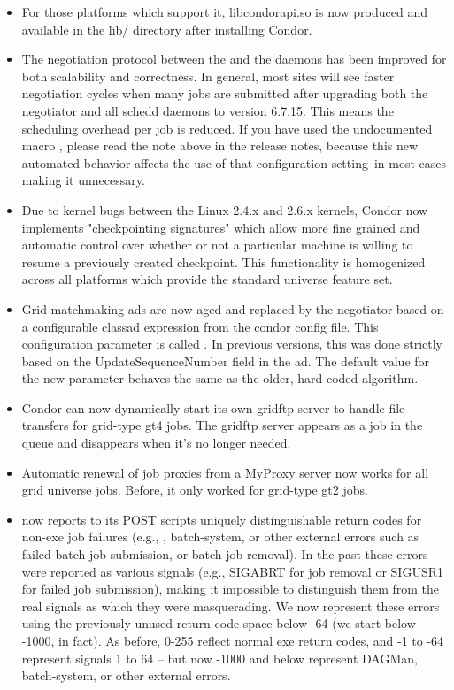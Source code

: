 \begin{itemize}

\item For those platforms which support it, libcondorapi.so is now
produced and available in the lib/ directory after installing Condor.

\item The negotiation protocol between the  and
the  daemons has been improved for both scalability and
correctness.  In general, most sites will see faster negotiation 
cycles when many jobs are submitted after upgrading both the negotiator
and all schedd daemons to version 6.7.15.  This means the scheduling overhead
per job is reduced.  If you have used the undocumented macro
, please read the note above in the release
notes, because this new automated behavior affects the use of that
configuration setting--in most cases making it unnecessary.

\item Due to kernel bugs between the Linux 2.4.x and 2.6.x kernels,
Condor now implements "checkpointing signatures" which allow more fine
grained and automatic control over whether or not a particular machine
is willing to resume a previously created checkpoint. This functionality
is homogenized across all platforms which provide the standard universe
feature set.

\item Grid matchmaking ads are now aged and replaced by the negotiator 
based on a configurable classad expression from the condor config file. This
configuration parameter is called .  
In previous versions, this was done strictly based on the 
UpdateSequenceNumber field in the ad.  The default value for the new 
parameter behaves the same as the older, hard-coded algorithm.

\item Condor can now dynamically start its own gridftp server to handle
file transfers for grid-type gt4 jobs. The gridftp server appears
as a job in the queue and disappears when it's no longer needed.

\item Automatic renewal of job proxies from a MyProxy server now works for
all grid universe jobs. Before, it only worked for grid-type gt2 jobs.

\item {} now reports to its POST scripts uniquely
distinguishable return codes for non-exe job failures (e.g.,
, batch-system, or other external errors such as failed
batch job submission, or batch job removal).  In the past these errors
were reported as various signals (e.g., SIGABRT for job removal or
SIGUSR1 for failed job submission), making it impossible to
distinguish them from the real signals as which they were
masquerading.  We now represent these errors using the
previously-unused return-code space below -64 (we start below -1000,
in fact).  As before, 0-255 reflect normal exe return codes, and -1 to
-64 represent signals 1 to 64 -- but now -1000 and below represent
DAGMan, batch-system, or other external errors.


\end{itemize}
